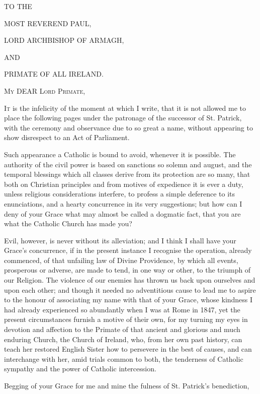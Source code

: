 



TO THE

MOST REVEREND PAUL,

LORD ARCHBISHOP OF ARMAGH,

AND

PRIMATE OF ALL IRELAND.


M\textsc{y} DEAR L\textsc{ord}
P\textsc{rimate},

I\textsc{t} is the infelicity of the moment at which I write, that it is not
allowed me to place the following pages under the patronage of the
successor of St. Patrick, with the ceremony and observance due to so
great a name, without appearing to show disrespect to an Act of
Parliament.


Such appearance a Catholic is bound to avoid, whenever it is
possible. The authority of the civil power is based on sanctions so
solemn and august, and the temporal blessings which all classes derive
from its protection are so many, that both on Christian principles and
from motives of expedience it is ever a duty, unless religious
considerations interfere, to profess a simple deference to its
enunciations, and a hearty concurrence in its very suggestions; but
how can I deny of your Grace what may almost be called a dogmatic
fact, that you are what the Catholic Church has made you?


Evil, however, is never without its alleviation; and I think I
shall have your Grace's concurrence, if in the present instance I
recognise the operation, already commenced, of that unfailing law of
Divine Providence, by which all events, prosperous or adverse, are
made to tend, in one way or other, to the triumph of our Religion. The
violence of our enemies has thrown us back upon ourselves and upon
each other; and though it needed no adventitious cause to lead me to
aspire to the honour of associating my name with that of your Grace,
whose kindness I had already experienced so abundantly when I was at
Rome in 1847, yet the present circumstances furnish a motive of their
own, for my turning my eyes in devotion and affection to the Primate
of that ancient and glorious and much enduring Church, the Church of
Ireland, who, from her own past history, can teach her restored
English Sister how to persevere in the best of causes, and can
interchange with her, amid trials common to both, the tenderness of
Catholic sympathy and the power of Catholic intercession.


Begging of your Grace for me and mine the fulness of St. Patrick's
benediction,

